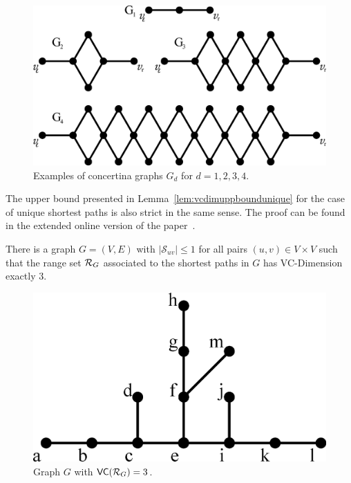 \begin{figure}[th]
  \centering
  \includegraphics[scale=0.3]{figures/eps/tight}
  \caption{Examples of concertina graphs $G_d$ for $d=1,2,3,4$.}
  \label{fig:tightgraphs}
\end{figure}

The upper bound presented in Lemma~\ref{lem:vcdimuppboundunique}  for the case
of unique shortest paths is also strict in the same sense.
\ifproof
\else
The proof can be found in the extended online version of the
paper~\citep{Anonymous13}.
\fi

\begin{lemma}\label{lem:vcdimlowboundunique}
  There is a graph $G=(V,E)$ with $|\mathcal{S}_{uv}|\le1$ for all
  pairs $(u,v)\in V\times V$ such that the range set $\mathcal{R}_G$ associated to the
  shortest paths in $G$ has VC-Dimension exactly $3$.
\end{lemma}

\ifproof
\begin{figure}[ht]
  \centering
  \includegraphics[scale=0.35]{figures/eps/uniqueshortestpathtight}
  \caption{Graph $G$ with $\mathsf{VC}(\mathcal{R}_G)= 3$.}
  \label{fig:uniquetight}
\end{figure}

